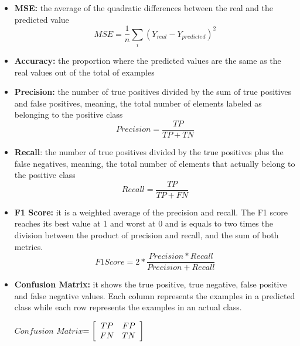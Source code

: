 \begin{itemize}
\item \textbf{MSE:} the average of the quadratic differences between the real and the predicted value
\begin{equation}
MSE=\frac{1}{n}\sum_i (Y_{real}-Y_{predicted})^2
\label{eq:msemet}
\end{equation}
\item \textbf{Accuracy:} the proportion where the predicted values are the same as the real values out of the total of examples

\item \textbf{Precision:} the number of true positives divided by the sum of true positives and false positives, meaning, the total number of elements labeled as belonging to the positive class 
\begin{equation}
Precision=\frac{TP}{TP+TN}
\label{eq:precision}
\end{equation}
\item \textbf{Recall}: the number of true positives divided by the true positives plus the false negatives, meaning, the total number of elements that actually belong to the positive class
\begin{equation}
Recall=\frac{TP}{TP+FN}
\label{eq:recall}
\end{equation}
\item \textbf{F1 Score:} it is a weighted average of the precision and recall. The F1 score reaches its best value at 1 and worst at 0 and is equals to two times the division between the product of precision and recall, and the sum of both metrics.
\begin{equation}
F1 Score=2*\frac{Precision*Recall}{Precision+Recall}
\label{eq:fiscore}
\end{equation}
\item \textbf{Confusion Matrix:} it shows the true positive, true negative, false positive and false negative values. Each column represents the examples in a predicted class while each row represents the examples in an actual class.
\begin{center}
$Confusion$ $Matrix$$ = 
\left[ {\begin{array}{*{20}c}
   TP & FP  \\
   FN & TN  \\

 \end{array} } \right]
$
\end{center}

\end{itemize}


























 